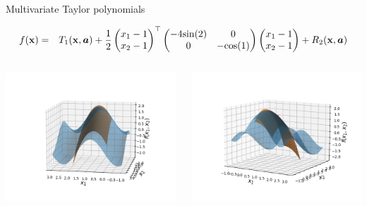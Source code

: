 \begin{vbframe}{Multivariate Taylor polynomials}
\begin{footnotesize}
  \begin{eqnarray*}
    f(\mathbf{x}) &=& T_1(\mathbf{x}, \bm{a}) + \frac{1}{2}\begin{pmatrix}x_1 - 1 \\ x_2 - 1 \end{pmatrix}^\top \begin{pmatrix} -4 \text{sin}(2) & 0 \\ 0 & -\text{cos}(1) \end{pmatrix} \begin{pmatrix}x_1 - 1 \\ x_2 - 1 \end{pmatrix} + R_2(\mathbf{x}, \bm{a})
  \end{eqnarray*}
  \vspace*{-0.2cm}
  \end{footnotesize}
  \begin{columns}
    \begin{column}{0.3\textwidth}
      \includegraphics[width = \textwidth]{figure_man/Taylor2D/Taylor2D_2nd-100.png}
    \end{column}
    \begin{column}{0.3\textwidth}
      \includegraphics[width = \textwidth]{figure_man/Taylor2D/Taylor2D_2nd-301.png}

\end{column}
\end{columns}
\end{vbframe}
